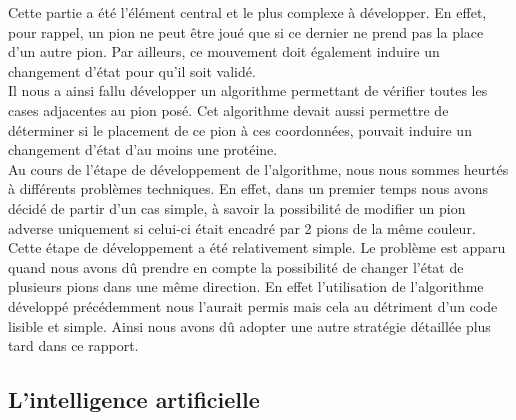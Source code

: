 Cette partie a été l'élément central et le plus complexe à développer. En effet, pour rappel, un pion ne peut être joué que si ce dernier ne prend pas la place d'un autre pion. Par ailleurs, ce mouvement doit également induire un changement d'état pour qu'il soit validé.
\\Il nous a ainsi fallu développer un algorithme permettant de vérifier toutes les cases adjacentes au pion posé. Cet algorithme devait aussi permettre de déterminer si le placement de ce pion à ces coordonnées, pouvait induire un changement d'état d'au moins une protéine.
\\Au cours de l'étape de développement de l'algorithme, nous nous sommes heurtés à différents problèmes techniques. En effet, dans un premier temps nous avons décidé de partir d'un cas simple, à savoir la possibilité de modifier un pion adverse uniquement si celui-ci était encadré par 2 pions de la même couleur. Cette étape de développement a été relativement simple. Le problème est apparu quand nous avons dû prendre en compte la possibilité de changer l'état de plusieurs pions dans une même direction. En effet l'utilisation de l'algorithme développé précédemment nous l'aurait permis mais cela au détriment d'un code lisible et simple. Ainsi nous avons dû adopter une autre stratégie détaillée plus tard dans ce rapport.

\subsection{L'intelligence artificielle}


